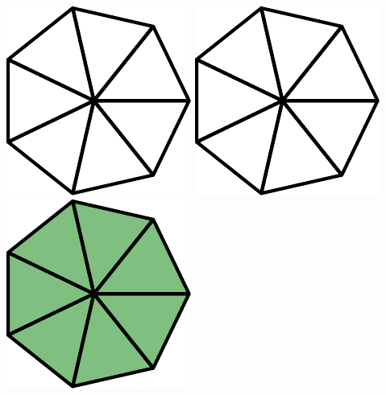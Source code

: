 \begin{center}
	\includegraphics[]{brokintro7a}\quad
	\includegraphics[]{brokintro7a}\quad
	\includegraphics[]{brokintro7b}
\end{center}
